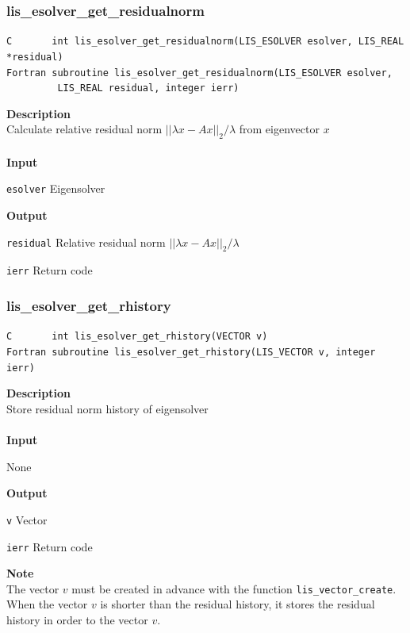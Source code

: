 \documentclass[a4paper]{article}
\newcommand{\namelistlabel}[1]{\mbox{#1}\hfill}
\newenvironment{namelist}[1]{%
 \begin{list}{}
  {\let\makelabel\namelistlabel
  \settowidth{\labelwidth}{#1}
  \setlength{\leftmargin}{1.1\labelwidth}}
}{%
\end{list}}
\begin{document}
  \subsubsection{lis\_esolver\_get\_residualnorm}
\begin{screen}
\verb|C       int lis_esolver_get_residualnorm(LIS_ESOLVER esolver, LIS_REAL *residual)|\\
\verb|Fortran subroutine lis_esolver_get_residualnorm(LIS_ESOLVER esolver,|\\
\verb|         LIS_REAL residual, integer ierr)|
\end{screen}
{\bf Description}\\
\indent
Calculate relative residual norm $||\lambda x-Ax||_2/\lambda$ from eigenvector $x$
\\ \\
\noindent
{\bf Input}
\begin{namelist}{XXXXXXXXXXXXXXXXXXXX}
\item[\tt esolver] Eigensolver
\end{namelist}
{\bf Output}
\begin{namelist}{XXXXXXXXXXXXXXXXXXXX}
\item[\tt residual]  Relative residual norm $||\lambda x-Ax||_2/\lambda$
\item[\tt ierr] Return code
\end{namelist}
\newpage
  \subsubsection{lis\_esolver\_get\_rhistory}
\begin{screen}
\verb|C       int lis_esolver_get_rhistory(VECTOR v)|\\
\verb|Fortran subroutine lis_esolver_get_rhistory(LIS_VECTOR v, integer ierr)|
\end{screen}
{\bf Description}\\
\indent
Store residual norm history of eigensolver
\\ \\
\noindent
{\bf Input}
\begin{namelist}{XXXXXXXXXXXXXXXXXXXX}
\item[None]
\end{namelist}
{\bf Output}
\begin{namelist}{XXXXXXXXXXXXXXXXXXXX}
\item[\tt v] Vector
\item[\tt ierr] Return code
\end{namelist}
{\bf Note}\\
\indent
The vector $v$ must be created in advance with the function \verb|lis_vector_create|. 
When the vector $v$ is shorter than the residual history, 
it stores the residual history in order to the vector $v$.
\newpage
\newpage
\end{document}
